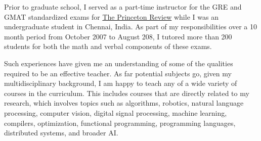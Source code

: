 \documentclass[10pt]{article}
\begin{document}
Prior to graduate school, I served as a part-time instructor for the GRE and
GMAT standardized exams for \href{http://www.princetonreview.com/}{The
  Princeton Review} while I was an undergraduate student in Chennai, India.
%
As part of my responsibilities over a 10 month period from October 2007 to
August 208, I tutored more than 200 students for both the math and verbal
components of these exams.
\vspace*{1ex}

Such experiences have given me an understanding of some of the qualities
required to be an effective teacher.
%
As far potential subjects go, given my multidisciplinary background, I am happy
to teach any of a wide variety of courses in the curriculum. This includes
courses that are directly related to my research, which involves topics such as
algorithms, robotics, natural language processing, computer vision, digital
signal processing, machine learning, compilers, optimization, functional
programming, programming languages, distributed systems, and broader AI.
\end{document}
